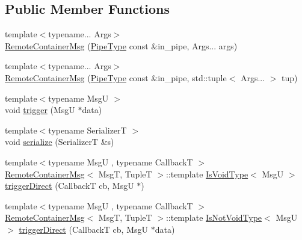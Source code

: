 \subsection*{Public Member Functions}
\begin{DoxyCompactItemize}
\item 
{\footnotesize template$<$typename... Args$>$ }\\\hyperlink{structvt_1_1pipe_1_1interface_1_1_remote_container_msg_a008403aabc55d4d862a5fe5b40879624}{Remote\+Container\+Msg} (\hyperlink{namespacevt_ac9852acda74d1896f48f406cd72c7bd3}{Pipe\+Type} const \&in\+\_\+pipe, Args... args)
\item 
{\footnotesize template$<$typename... Args$>$ }\\\hyperlink{structvt_1_1pipe_1_1interface_1_1_remote_container_msg_a3c058a9ea2b7f176f4d0604e596ec83a}{Remote\+Container\+Msg} (\hyperlink{namespacevt_ac9852acda74d1896f48f406cd72c7bd3}{Pipe\+Type} const \&in\+\_\+pipe, std\+::tuple$<$ Args... $>$ tup)
\item 
{\footnotesize template$<$typename MsgU $>$ }\\void \hyperlink{structvt_1_1pipe_1_1interface_1_1_remote_container_msg_a7710e198b9f5482c6239cc9c470c5bcd}{trigger} (MsgU $\ast$data)
\item 
{\footnotesize template$<$typename SerializerT $>$ }\\void \hyperlink{structvt_1_1pipe_1_1interface_1_1_remote_container_msg_a9c131bd45d1c897a6b4e54c7512da4ce}{serialize} (SerializerT \&s)
\item 
{\footnotesize template$<$typename MsgU , typename CallbackT $>$ }\\\hyperlink{structvt_1_1pipe_1_1interface_1_1_remote_container_msg}{Remote\+Container\+Msg}$<$ MsgT, TupleT $>$\+::template \hyperlink{structvt_1_1pipe_1_1interface_1_1_remote_container_msg_af3f6ea130372986d8d0b4c39f35f59b6}{Is\+Void\+Type}$<$ MsgU $>$ \hyperlink{structvt_1_1pipe_1_1interface_1_1_remote_container_msg_a5875d056f5e8a41ea1c69f173ae9dfa7}{trigger\+Direct} (CallbackT cb, MsgU $\ast$)
\item 
{\footnotesize template$<$typename MsgU , typename CallbackT $>$ }\\\hyperlink{structvt_1_1pipe_1_1interface_1_1_remote_container_msg}{Remote\+Container\+Msg}$<$ MsgT, TupleT $>$\+::template \hyperlink{structvt_1_1pipe_1_1interface_1_1_remote_container_msg_ab12f66d491cc0783269a302390f76a1d}{Is\+Not\+Void\+Type}$<$ MsgU $>$ \hyperlink{structvt_1_1pipe_1_1interface_1_1_remote_container_msg_ae4913666223bebdeda5d7da19beec782}{trigger\+Direct} (CallbackT cb, MsgU $\ast$data)
\end{DoxyCompactItemize}


